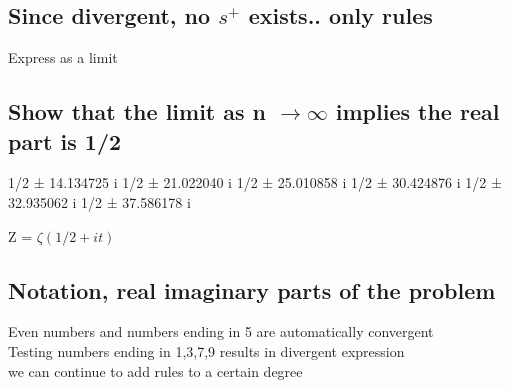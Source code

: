 \documentclass[11pt]{article}
\begin{document}

\subsection{Since divergent, no $s^{+}$ exists.. only rules}
Express as a limit

\subsection{Show that the limit as n $\rightarrow \infty$ implies the real part is 1/2}
1/2 ± 14.134725 i
1/2 ± 21.022040 i
1/2 ± 25.010858 i
1/2 ± 30.424876 i
1/2 ± 32.935062 i
1/2 ± 37.586178 i

Z = $\zeta(1/2 + it)$

\subsection{Notation, real imaginary parts of the problem}
Even numbers and numbers ending in 5 are automatically convergent\\
Testing numbers ending in 1,3,7,9 results in divergent expression\\
we can continue to add rules to a certain degree




















\newpage
\end{document}
